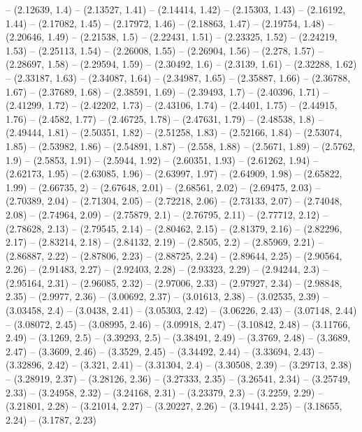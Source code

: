 -- (2.12639, 1.4)
-- (2.13527, 1.41)
-- (2.14414, 1.42)
-- (2.15303, 1.43)
-- (2.16192, 1.44)
-- (2.17082, 1.45)
-- (2.17972, 1.46)
-- (2.18863, 1.47)
-- (2.19754, 1.48)
-- (2.20646, 1.49)
-- (2.21538, 1.5)
-- (2.22431, 1.51)
-- (2.23325, 1.52)
-- (2.24219, 1.53)
-- (2.25113, 1.54)
-- (2.26008, 1.55)
-- (2.26904, 1.56)
-- (2.278, 1.57)
-- (2.28697, 1.58)
-- (2.29594, 1.59)
-- (2.30492, 1.6)
-- (2.3139, 1.61)
-- (2.32288, 1.62)
-- (2.33187, 1.63)
-- (2.34087, 1.64)
-- (2.34987, 1.65)
-- (2.35887, 1.66)
-- (2.36788, 1.67)
-- (2.37689, 1.68)
-- (2.38591, 1.69)
-- (2.39493, 1.7)
-- (2.40396, 1.71)
-- (2.41299, 1.72)
-- (2.42202, 1.73)
-- (2.43106, 1.74)
-- (2.4401, 1.75)
-- (2.44915, 1.76)
-- (2.4582, 1.77)
-- (2.46725, 1.78)
-- (2.47631, 1.79)
-- (2.48538, 1.8)
-- (2.49444, 1.81)
-- (2.50351, 1.82)
-- (2.51258, 1.83)
-- (2.52166, 1.84)
-- (2.53074, 1.85)
-- (2.53982, 1.86)
-- (2.54891, 1.87)
-- (2.558, 1.88)
-- (2.5671, 1.89)
-- (2.5762, 1.9)
-- (2.5853, 1.91)
-- (2.5944, 1.92)
-- (2.60351, 1.93)
-- (2.61262, 1.94)
-- (2.62173, 1.95)
-- (2.63085, 1.96)
-- (2.63997, 1.97)
-- (2.64909, 1.98)
-- (2.65822, 1.99)
-- (2.66735, 2)
-- (2.67648, 2.01)
-- (2.68561, 2.02)
-- (2.69475, 2.03)
-- (2.70389, 2.04)
-- (2.71304, 2.05)
-- (2.72218, 2.06)
-- (2.73133, 2.07)
-- (2.74048, 2.08)
-- (2.74964, 2.09)
-- (2.75879, 2.1)
-- (2.76795, 2.11)
-- (2.77712, 2.12)
-- (2.78628, 2.13)
-- (2.79545, 2.14)
-- (2.80462, 2.15)
-- (2.81379, 2.16)
-- (2.82296, 2.17)
-- (2.83214, 2.18)
-- (2.84132, 2.19)
-- (2.8505, 2.2)
-- (2.85969, 2.21)
-- (2.86887, 2.22)
-- (2.87806, 2.23)
-- (2.88725, 2.24)
-- (2.89644, 2.25)
-- (2.90564, 2.26)
-- (2.91483, 2.27)
-- (2.92403, 2.28)
-- (2.93323, 2.29)
-- (2.94244, 2.3)
-- (2.95164, 2.31)
-- (2.96085, 2.32)
-- (2.97006, 2.33)
-- (2.97927, 2.34)
-- (2.98848, 2.35)
-- (2.9977, 2.36)
-- (3.00692, 2.37)
-- (3.01613, 2.38)
-- (3.02535, 2.39)
-- (3.03458, 2.4)
-- (3.0438, 2.41)
-- (3.05303, 2.42)
-- (3.06226, 2.43)
-- (3.07148, 2.44)
-- (3.08072, 2.45)
-- (3.08995, 2.46)
-- (3.09918, 2.47)
-- (3.10842, 2.48)
-- (3.11766, 2.49)
-- (3.1269, 2.5)
-- (3.39293, 2.5)
-- (3.38491, 2.49)
-- (3.3769, 2.48)
-- (3.3689, 2.47)
-- (3.3609, 2.46)
-- (3.3529, 2.45)
-- (3.34492, 2.44)
-- (3.33694, 2.43)
-- (3.32896, 2.42)
-- (3.321, 2.41)
-- (3.31304, 2.4)
-- (3.30508, 2.39)
-- (3.29713, 2.38)
-- (3.28919, 2.37)
-- (3.28126, 2.36)
-- (3.27333, 2.35)
-- (3.26541, 2.34)
-- (3.25749, 2.33)
-- (3.24958, 2.32)
-- (3.24168, 2.31)
-- (3.23379, 2.3)
-- (3.2259, 2.29)
-- (3.21801, 2.28)
-- (3.21014, 2.27)
-- (3.20227, 2.26)
-- (3.19441, 2.25)
-- (3.18655, 2.24)
-- (3.1787, 2.23)
